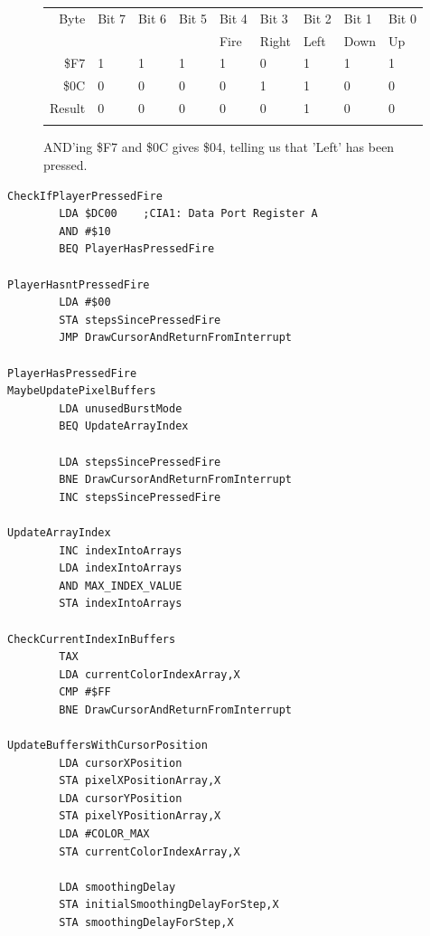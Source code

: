 \begin{figure}[H]
  {
    \setlength{\tabcolsep}{3.0pt}
    \setlength\cmidrulewidth{\heavyrulewidth} %
    \begin{adjustbox}{width=7cm,center}

      \begin{tabular}{rllllllll}
        \toprule
        Byte & Bit 7 & Bit 6 & Bit 5 & Bit 4 & Bit 3 & Bit 2 & Bit 1 & Bit 0        \\
             &       &       &       & Fire  & Right & Left  & Down  & Up           \\
        \midrule
        \$F7 & 1 & 1 & 1 & 1 & 0 & 1 & 1 & 1 \\
        \$0C & 0 & 0 & 0 & 0 & 1 & 1 & 0 & 0 \\
        \midrule
        Result & 0 & 0 & 0 & 0 & 0 & 1 & 0 & 0 \\
        \addlinespace
        \bottomrule
      \end{tabular}
    \end{adjustbox}
    }\caption*{AND'ing \$F7 and \$0C gives \$04, telling us that 'Left' has been pressed.}
\end{figure}

\clearpage
\begin{lstlisting}[caption= Third part of the Interrupt Handler.]
CheckIfPlayerPressedFire   
        LDA $DC00    ;CIA1: Data Port Register A
        AND #$10
        BEQ PlayerHasPressedFire

PlayerHasntPressedFire
        LDA #$00
        STA stepsSincePressedFire
        JMP DrawCursorAndReturnFromInterrupt

PlayerHasPressedFire
MaybeUpdatePixelBuffers   
        LDA unusedBurstMode
        BEQ UpdateArrayIndex

        LDA stepsSincePressedFire
        BNE DrawCursorAndReturnFromInterrupt
        INC stepsSincePressedFire

UpdateArrayIndex   
        INC indexIntoArrays
        LDA indexIntoArrays
        AND MAX_INDEX_VALUE
        STA indexIntoArrays

CheckCurrentIndexInBuffers  
        TAX 
        LDA currentColorIndexArray,X
        CMP #$FF
        BNE DrawCursorAndReturnFromInterrupt

UpdateBuffersWithCursorPosition
        LDA cursorXPosition
        STA pixelXPositionArray,X
        LDA cursorYPosition
        STA pixelYPositionArray,X
        LDA #COLOR_MAX
        STA currentColorIndexArray,X

        LDA smoothingDelay
        STA initialSmoothingDelayForStep,X
        STA smoothingDelayForStep,X

\end{lstlisting}
\clearpage


